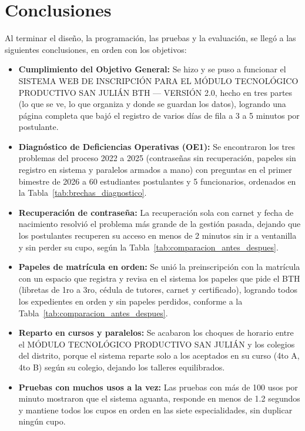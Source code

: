 \section{Conclusiones}
\label{sec:conclusiones}

Al terminar el diseño, la programación, las pruebas y la evaluación, se llegó a las siguientes conclusiones, en orden con los objetivos:

\begin{itemize}
    \item \textbf{Cumplimiento del Objetivo General:} Se hizo y se puso a funcionar el SISTEMA WEB DE INSCRIPCIÓN PARA EL MÓDULO TECNOLÓGICO PRODUCTIVO SAN JULIÁN BTH --- VERSIÓN 2.0, hecho en tres partes (lo que se ve, lo que organiza y donde se guardan los datos), logrando una página completa que bajó el registro de varios días de fila a 3 a 5 minutos por postulante.
    \item \textbf{Diagnóstico de Deficiencias Operativas (OE1):} Se encontraron los tres problemas del proceso 2022 a 2025 (contraseñas sin recuperación, papeles sin registro en sistema y paralelos armados a mano) con preguntas en el primer bimestre de 2026 a 60 estudiantes postulantes y 5 funcionarios, ordenados en la Tabla~\ref{tab:brechas_diagnostico}.
    \item \textbf{Recuperación de contraseña:} La recuperación sola con carnet y fecha de nacimiento resolvió el problema más grande de la gestión pasada, dejando que los postulantes recuperen su acceso en menos de 2 minutos sin ir a ventanilla y sin perder su cupo, según la Tabla~\ref{tab:comparacion_antes_despues}.
    \item \textbf{Papeles de matrícula en orden:} Se unió la preinscripción con la matrícula con un espacio que registra y revisa en el sistema los papeles que pide el BTH (libretas de 1ro a 3ro, cédula de tutores, carnet y certificado), logrando todos los expedientes en orden y sin papeles perdidos, conforme a la Tabla~\ref{tab:comparacion_antes_despues}.
    \item \textbf{Reparto en cursos y paralelos:} Se acabaron los choques de horario entre el MÓDULO TECNOLÓGICO PRODUCTIVO SAN JULIÁN y los colegios del distrito, porque el sistema reparte solo a los aceptados en su curso (4to A, 4to B) según su colegio, dejando los talleres equilibrados.
    \item \textbf{Pruebas con muchos usos a la vez:} Las pruebas con más de 100 usos por minuto mostraron que el sistema aguanta, responde en menos de 1.2 segundos y mantiene todos los cupos en orden en las siete especialidades, sin duplicar ningún cupo.

\end{itemize}
